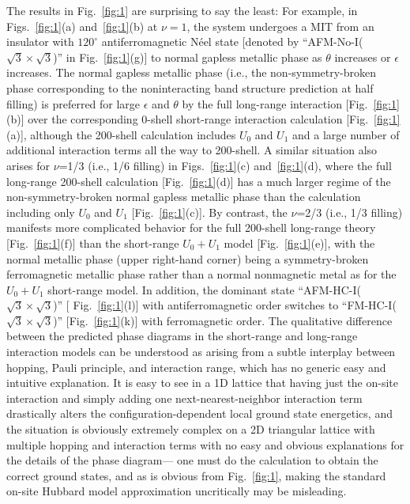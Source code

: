 \documentclass[aps,prb,twocolumn,superscriptaddress,longbibliography]{revtex4-2}
\begin{document}
The results in Fig.~\ref{fig:1} are surprising to say the least: For example, in Figs.~\ref{fig:1}(a) and~\ref{fig:1}(b) at $\nu=1$, the system undergoes a MIT from an insulator with $120^\circ$ antiferromagnetic N\'eel state [denoted by ``AFM-No-I($\sqrt{3}\times \sqrt{3}$)'' in Fig.~\ref{fig:1}(g)] to normal gapless metallic phase as $\theta$ increases or $\epsilon$ increases. 
The normal gapless metallic phase (i.e., the non-symmetry-broken phase corresponding to the noninteracting band structure prediction at half filling) is preferred for large $\epsilon$ and $\theta$ by the full long-range interaction [Fig.~\ref{fig:1}(b)] over the corresponding 0-shell short-range interaction calculation [Fig.~\ref{fig:1}(a)], although the 200-shell calculation includes $U_0$ and $U_1$ and a large number of additional interaction terms all the way to 200-shell.  
A similar situation also arises for $\nu$=1/3 (i.e., 1/6 filling) in Figs.~\ref{fig:1}(c) and~\ref{fig:1}(d), where the full long-range 200-shell calculation [Fig.~\ref{fig:1}(d)] has a much larger regime of the non-symmetry-broken normal gapless metallic phase than the calculation including only $U_0$ and $U_1$ [Fig.~\ref{fig:1}(c)].
By contrast, the $\nu$=2/3 (i.e., 1/3 filling) manifests more complicated behavior for the full 200-shell long-range theory [Fig.~\ref{fig:1}(f)] than the short-range $U_0 + U_1$ model [Fig.~\ref{fig:1}(e)], with the normal metallic phase (upper right-hand corner) being a symmetry-broken ferromagnetic metallic phase rather than a normal nonmagnetic metal as for the $U_0 + U_1$ short-range model.  In addition, the dominant state ``AFM-HC-I($\sqrt{3}\times\sqrt{3}$)'' [ Fig.~\ref{fig:1}(l)] with antiferromagnetic order switches to ``FM-HC-I($\sqrt{3}\times\sqrt{3}$)'' [Fig.~\ref{fig:1}(k)] with ferromagnetic order. The qualitative difference between the predicted phase diagrams in the short-range and long-range interaction models can be understood as arising from a subtle interplay between hopping, Pauli principle, and interaction range, which has no generic easy and intuitive explanation.  It is easy to see in a 1D lattice that having just the on-site interaction and simply adding one next-nearest-neighbor interaction term drastically alters the configuration-dependent local ground state energetics, and the situation is obviously extremely complex on a 2D triangular lattice with multiple hopping and interaction terms with no easy and obvious explanations for the details of the phase diagram--- one must do the calculation to obtain the correct ground states, and as is obvious from Fig.~\ref{fig:1}, making the standard on-site Hubbard model approximation uncritically may be misleading. 
\end{document}
